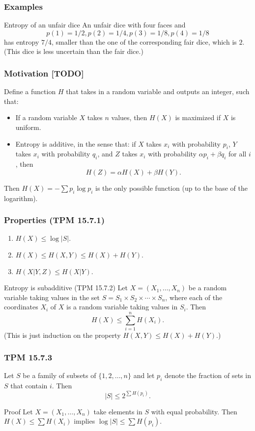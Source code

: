 \documentclass{beamer}
\begin{document}
\begin{frame}
  \frametitle{Examples}
  \begin{exampleblock}{Entropy of an unfair dice}
    An unfair dice with four faces and \[ p(1) = 1/2, p(2) = 1/4, p(3) = 1/8, p(4) = 1/8 \] has entropy $7/4$, smaller than the one of the corresponding fair dice, which is $2$. (This dice is less uncertain than the fair dice.)
  \end{exampleblock}
\end{frame}

\begin{frame}
  \frametitle{Motivation [TODO]}
  Define a function $H$ that takes in a random variable and outputs an integer, such that:
  \begin{itemize}
    \item If a random variable $X$ takes $n$ values, then $H(X)$ is maximized if $X$ is uniform.
    \item Entropy is additive, in the sense that: if $X$ takes $x_i$ with probability $p_i$, $Y$ takes $x_i$ with probability $q_i$, and $Z$ takes $x_i$ with probability $\alpha p_i + \beta q_i$ for all $i$, then \[ H(Z) = \alpha H(X) + \beta H(Y). \]
  \end{itemize}
  Then $H(X) = - \sum p_i \log p_i$ is the only possible function (up to the base of the logarithm).
\end{frame}

\begin{frame}
  \frametitle{Properties (TPM 15.7.1)}
  \begin{enumerate}
    \item $H(X) \le \log |S|$.
    \item $H(X) \le H(X, Y) \le H(X) + H(Y)$.
    \item $H(X|Y, Z) \le H(X|Y)$.
  \end{enumerate}

  \begin{block}{Entropy is subadditive (TPM 15.7.2)}
    Let $X = (X_1, \dotsc, X_n)$ be a random variable taking values in the set $S = S_1 \times S_2 \times \dotsb \times S_n$, where each of the coordinates $X_i$ of $X$ is a random variable taking values in $S_i$. Then \[ H(X) \le \sum_{i = 1}^n H(X_i). \] (This is just induction on the property $H(X, Y) \le H(X) + H(Y)$.)
  \end{block}
\end{frame}

\begin{frame}
  \frametitle{TPM 15.7.3}
  Let $S$ be a family of subsets of $\{ 1, 2, \dotsc, n \}$ and let $p_i$ denote the fraction of sets in $S$ that contain $i$. Then \[ |S| \le 2^{\sum H(p_i)}. \]

  \begin{block}{Proof}
    Let $X = (X_1, \dotsc, X_n)$ take elements in $S$ with equal probability. Then $H(X) \le \sum H(X_i)$ implies $\log |S| \le \sum H(p_i)$.
  \end{block}
\end{frame}
\end{document}

